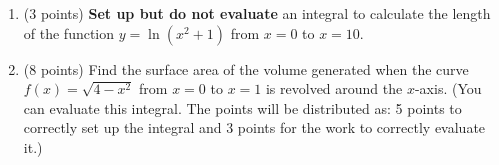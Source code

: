 \documentclass[12pt]{article}
\begin{document}
\begin{enumerate}

Formulas: \hspace{.3in} $\text{arc length} = \displaystyle{\int_a^b}\sqrt{1+(f'(x))^2} \: dx$ \hspace{.3in} $\text{surface area} = \displaystyle{\int_a^b}2 \pi f(x)\sqrt{1+(f'(x))^2} \: dx$
\item (3 points)  \textbf{Set up but do not evaluate} an integral to calculate the length of the function $y=\ln(x^2+1)$ from $x=0$ to $x=10.$

\vfill

\item (8 points) Find the surface area of the volume generated when the curve $f(x)=\sqrt{4-x^2}$ from $x=0$ to $x=1$ is revolved around the $x$-axis. (You can evaluate this integral. The points will be distributed as: 5 points to correctly set up the integral and 3 points for the work to correctly evaluate it.)

\vfill

\vfill

\vfill
 


\end{enumerate}
\end{document}
